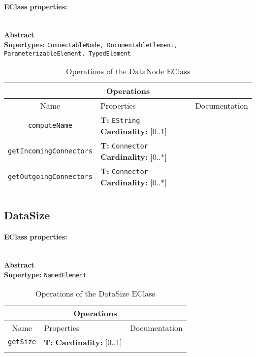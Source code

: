 \documentclass{article}
\begin{document}
\paragraph{EClass properties:} \hspace{0pt} \\ \indent
\textbf{Abstract}
\\
\textbf{Supertypes: }\texttt{ConnectableNode, DocumentableElement, ParameterizableElement, TypedElement}
\begin{table}[H]
\footnotesize
\begin{tabularx}{\textwidth}{|c| p{4 cm} | X |}
\hline
\multicolumn{3}{|c|}{\textbf{Operations}} \\
\hline
Name & Properties & Documentation \\ \hline \hline
\texttt{computeName}
 & 
\textbf{T:} \texttt{EString}
\newline
\textbf{Cardinality:} [0..1]
 & \\ \hline
\texttt{getIncomingConnectors}
 & 
\textbf{T:} \texttt{Connector}
\newline
\textbf{Cardinality:} [0..*]
 & \\ \hline
\texttt{getOutgoingConnectors}
 & 
\textbf{T:} \texttt{Connector}
\newline
\textbf{Cardinality:} [0..*]
 & \\ \hline
\caption{Operations of the DataNode EClass}
\end{tabularx}
\label{e4smDataNodeop}
\end{table}
\subsection[DataSize]{DataSize}
\label{e4smDataSize}

\paragraph{EClass properties:} \hspace{0pt} \\ \indent
\textbf{Abstract}
\\
\textbf{Supertype: }\texttt{NamedElement}
\begin{table}[H]
\footnotesize
\begin{tabularx}{\textwidth}{|c| p{4 cm} | X |}
\hline
\multicolumn{3}{|c|}{\textbf{Operations}} \\
\hline
Name & Properties & Documentation \\ \hline \hline
\texttt{getSize}
 & 
\textbf{T:} \texttt{}
\newline
\textbf{Cardinality:} [0..1]
 & \\ \hline
\caption{Operations of the DataSize EClass}
\end{tabularx}
\label{e4smDataSizeop}
\end{table}
\end{document}
